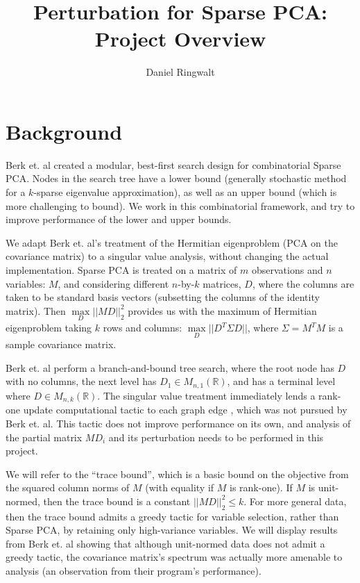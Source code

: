 \documentclass{article}
\title{Perturbation for Sparse PCA: Project Overview}
\author{Daniel Ringwalt}
\begin{document}
	
\maketitle

\section{Background}

Berk et. al \cite{berk2019certifiably} created a modular, best-first search design for combinatorial Sparse PCA. Nodes in the search tree have a lower bound (generally stochastic method for a $k$-sparse eigenvalue approximation), as well as an upper bound (which is more challenging to bound). We work in this combinatorial framework, and try to improve performance of the lower and upper bounds.

We adapt Berk et. al's treatment of the Hermitian eigenproblem (PCA on the covariance matrix) to a singular value analysis, without changing the actual implementation. Sparse PCA is treated on a matrix of $m$ observations and $n$ variables: $M$, and considering different $n$-by-$k$ matrices, $D$, where the columns are taken to be standard basis vectors (subsetting the columns of the identity matrix). Then $\max\limits_D ||MD||_2^2$ provides us with the maximum of Hermitian eigenproblem taking $k$ rows and columns: $\max\limits_D ||D^T \Sigma D||$, where $\Sigma = M^T M$ is a sample covariance matrix.

Berk et. al perform a branch-and-bound \cite{lawler1966branch} tree search, where the root node has $D$ with no columns, the next level has $D_1 \in M_{n,1}(\mathbb{R})$, and has a terminal level where $D \in M_{n,k}(\mathbb{R})$. The singular value treatment immediately lends a rank-one update computational tactic to each graph edge \cite{bunch1978updating}, which was not pursued by Berk et. al. This tactic does not improve performance on its own, and analysis of the partial matrix $MD_i$ and its perturbation needs to be performed in this project.

We will refer to the ``trace bound'', which is a basic bound on the objective from the squared column norms of $M$ (with equality if $M$ is rank-one). If $M$ is unit-normed, then the trace bound is a constant $||MD||_2^2 \le k$. For more general data, then the trace bound admits a greedy tactic for variable selection, rather than Sparse PCA, by retaining only high-variance variables. We will display results from Berk et. al showing that although unit-normed data does not admit a greedy tactic, the covariance matrix's spectrum was actually more amenable to analysis (an observation from their program's performance).
\end{document}
